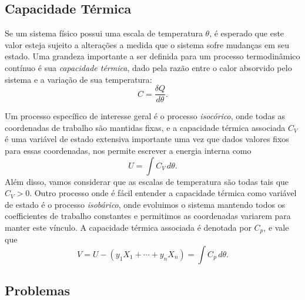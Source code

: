 \subsection{Capacidade Térmica}

Se um sistema físico possui uma escala de temperatura $\theta$, é esperado que
este valor esteja sujeito a alterações a medida que o sistema sofre mudanças em
seu estado. Uma grandeza importante a ser definida para um processo
termodinâmico contínuo é sua \emph{capacidade térmica}, dado pela razão entre o
calor absorvido pelo sistema e a variação de sua temperatura:
$$C=\frac{\delta Q}{d\theta}.$$

Um processo específico de interesse geral é o processo \emph{isocórico}, onde
todas as coordenadas de trabalho são mantidas fixas, e a capacidade térmica
associada $C_V$ é uma variável de estado extensiva importante uma vez que dados
valores fixos para essas coordenadas, nos permite escrever a energia interna
como
$$U=\int C_V\,d\theta.$$
Além disso, vamos considerar que as escalas de temperatura são todas tais que
$C_V>0$. Outro processo onde é fácil entender a capacidade térmica como variável
de estado é o processo \emph{isobárico}, onde evoluimos o sistema mantendo todos
os coefficientes de trabalho constantes e permitimos as coordenadas variarem
para manter este vínculo. A capacidade térmica associada é denotada por $C_p$, e
vale que
$$V=U-(y_1X_1+\cdots+y_nX_n)=\int C_p\,d\theta.$$

\subsection{Problemas}

